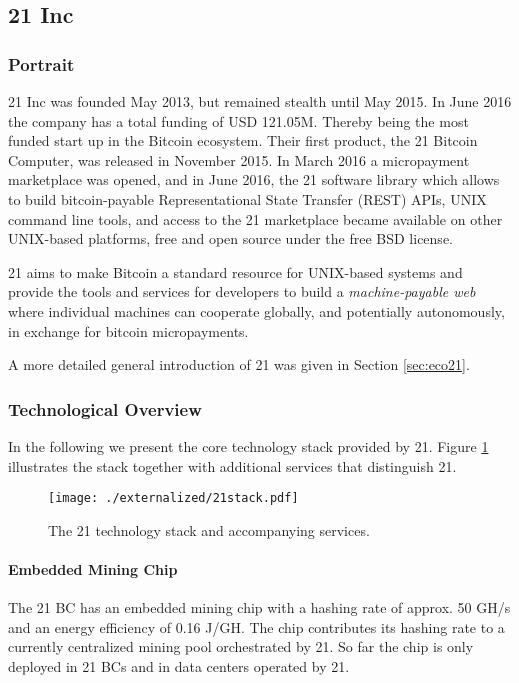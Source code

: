 \subsection{21 Inc}

\subsubsection{Portrait}
21 Inc was founded May 2013, but remained stealth until May 2015. In June 2016 the company has a total funding of USD 121.05M. Thereby being the most funded start up in the Bitcoin ecosystem. Their first product, the 21 Bitcoin Computer, was released in November 2015. In March 2016 a micropayment marketplace was opened, and in June 2016, the 21 software library which allows to build bitcoin-payable Representational State Transfer (REST) APIs, UNIX command line tools, and access to the 21 marketplace became available on other UNIX-based platforms, free and open source under the free BSD license.

21 aims to make Bitcoin a standard resource for UNIX-based systems and provide the tools and services for developers to build a \emph{machine-payable web} where individual machines can cooperate globally, and potentially autonomously, in exchange for bitcoin micropayments.

A more detailed general introduction of 21 was given in Section \ref{sec:eco21}.

\subsubsection{Technological Overview}

In the following we present the core technology stack provided by 21. Figure \ref{fig:21stack} illustrates the stack together with additional services that distinguish 21.

\begin{figure}
\centering
\texttt{[image: ./externalized/21stack.pdf]}
\caption{The 21 technology stack and accompanying services.}
\label{fig:21stack}
\end{figure}

\paragraph{Embedded Mining Chip}

The 21 BC has an embedded mining chip with a hashing rate of approx. 50 GH/s and an energy efficiency of 0.16 J/GH. The chip contributes its hashing rate to a currently centralized mining pool orchestrated by 21. So far the chip is only deployed in 21 BCs and in data centers operated by 21.   

